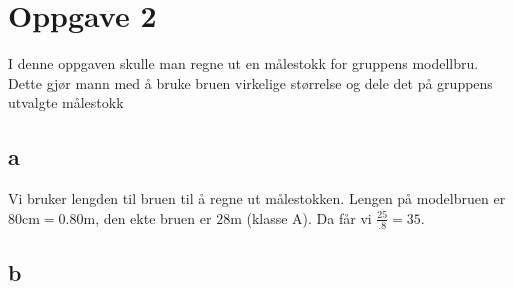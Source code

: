 \documentclass{report}
\begin{document}
\section{Oppgave 2}









I denne oppgaven skulle man regne ut en målestokk for gruppens modellbru. Dette gjør mann med å bruke bruen virkelige størrelse og dele det på gruppens utvalgte målestokk

\subsection{a}

Vi bruker lengden til bruen til å regne ut målestokken. Lengen på modelbruen er $80\mathrm {cm} = 0.80\mathrm m$, den ekte bruen er $28\mathrm m$ (klasse A). Da får vi $\frac {25} {.8} = 35$.

\subsection{b}
\end{document}
